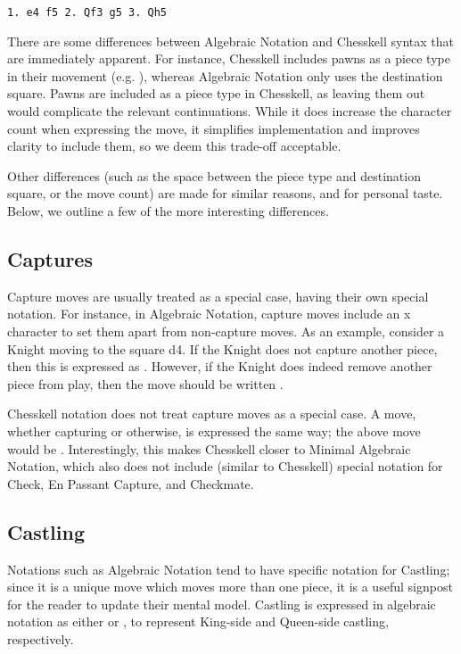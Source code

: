 \begin{verbatim}
1. e4 f5 2. Qf3 g5 3. Qh5
\end{verbatim}

There are some differences between Algebraic Notation and Chesskell syntax that are immediately apparent. For instance, Chesskell includes pawns as a piece type in their movement (e.g. ), whereas Algebraic Notation only uses the destination square. Pawns are included as a piece type in Chesskell, as leaving them out would complicate the relevant continuations. While it does increase the character count when expressing the move, it simplifies implementation and improves clarity to include them, so we deem this trade-off acceptable.

Other differences (such as the space between the piece type and destination square, or the move count) are made for similar reasons, and for personal taste. Below, we outline a few of the more interesting differences.

\subsection{Captures}

Capture moves are usually treated as a special case, having their own special notation. For instance, in Algebraic Notation, capture moves include an x character to set them apart from non-capture moves. As an example, consider a Knight moving to the square d4. If the Knight does not capture another piece, then this is expressed as . However, if the Knight does indeed remove another piece from play, then the move should be written .

Chesskell notation does not treat capture moves as a special case. A move, whether capturing or otherwise, is expressed the same way; the above move would be . Interestingly, this makes Chesskell closer to Minimal Algebraic Notation, which also does not include (similar to Chesskell) special notation for Check, En Passant Capture, and Checkmate.

\subsection{Castling} \label{castleextension}

Notations such as Algebraic Notation tend to have specific notation for Castling; since it is a unique move which moves more than one piece, it is a useful signpost for the reader to update their mental model. Castling is expressed in algebraic notation as either  or , to represent King-side and Queen-side castling, respectively.

